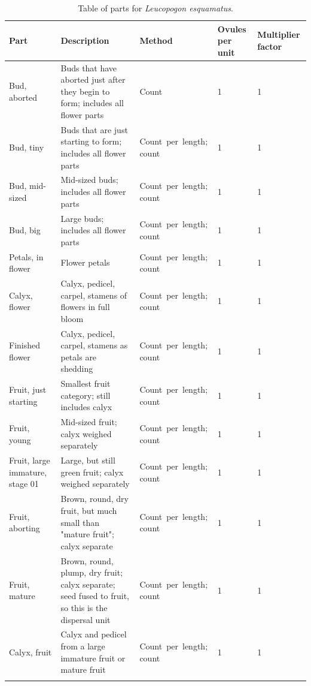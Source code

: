 \documentclass[10pt,twoside]{article}\usepackage[]{graphicx}\usepackage[]{color}
\begin{document}
\clearpage
\begingroup\small
\begin{longtable}{p{4.5cm}p{6cm}p{2cm}p{1cm}p{1cm}}
\caption{Table of parts for \emph{Leucopogon esquamatus}.} \\ 
  \hline
Part & Description & Method & Ovules per unit & Multiplier factor \\ 
  \hline
Bud, aborted & Buds that have aborted just after they begin to form; includes all flower parts & Count & 1 &   1 \\ 
  Bud, tiny & Buds that are just starting to form; includes all flower parts & Count\ per\ length; count & 1 &   1 \\ 
  Bud, mid-sized & Mid-sized buds; includes all flower parts & Count\ per\ length; count & 1 &   1 \\ 
  Bud, big & Large buds; includes all flower parts & Count\ per\ length; count & 1 &   1 \\ 
  Petals, in flower & Flower petals & Count\ per\ length; count & 1 &   1 \\ 
  Calyx, flower & Calyx, pedicel, carpel, stamens of flowers in full bloom & Count\ per\ length; count & 1 &   1 \\ 
  Finished flower & Calyx, pedicel, carpel, stamens as petals are shedding & Count\ per\ length; count & 1 &   1 \\ 
  Fruit, just starting & Smallest fruit category; still includes calyx & Count\ per\ length; count & 1 &   1 \\ 
  Fruit, young & Mid-sized fruit; calyx weighed separately & Count\ per\ length; count & 1 &   1 \\ 
  Fruit, large immature, stage 01 & Large, but still green fruit; calyx weighed separately & Count\ per\ length; count & 1 &   1 \\ 
  Fruit, aborting & Brown, round, dry fruit, but much small than "mature fruit"; calyx separate & Count\ per\ length; count & 1 &   1 \\ 
  Fruit, mature & Brown, round, plump, dry fruit; calyx separate; seed fused to fruit, so this is the dispersal unit & Count\ per\ length; count & 1 &   1 \\ 
  Calyx, fruit & Calyx and pedicel from a large immature fruit or mature fruit & Count\ per\ length; count & 1 &   1 \\ 
   \hline
\hline
\label{tab:parts_Leucopogon_esquamatus}
\end{longtable}
\endgroup
\end{document}
